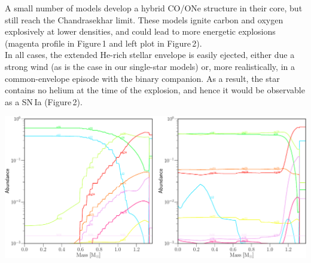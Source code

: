\documentclass[a0paper,portrait]{baposter}
\begin{document}
\begin{poster}
{A small number of models develop a hybrid CO/ONe structure in their core, but still reach the Chandrasekhar limit. These models ignite carbon and oxygen explosively at lower densities, and could lead to more energetic explosions (magenta profile in Figure\,1 and left plot in Figure\,2). 
\\[0.57cm]
In all  cases, the extended He-rich stellar envelope is easily ejected, either due a strong wind (as is the case in our single-star models) or, more realistically, in a common-envelope episode with the binary companion.  As a result, the star contains no helium at the time of the explosion, and hence it would be observable as a SN\,Ia (Figure\,2). 




\begin{center}
    \includegraphics[width=0.85\linewidth]{figures/combineAbun.pdf}
 \end{center}
}






\end{poster}
\end{document}
